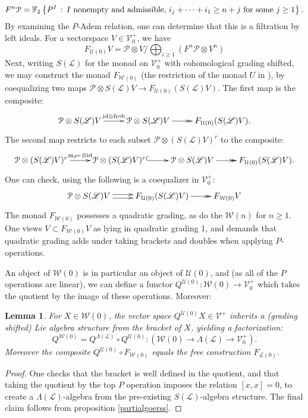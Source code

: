 \documentclass[11pt]{amsart}
\theoremstyle{plain}
\newtheorem{lem}[thm]{Lemma}
\theoremstyle{definition}
\renewcommand{\to}{\longrightarrow}
\newcommand{\scrL}{\mathscr{L}}
\newcommand{\calW}{\mathcal{W}}
\newcommand{\calU}{\mathcal{U}}
\newcommand{\calP}{\mathcal{P}}
\newcommand{\calL}{\mathcal{L}}
\newcommand{\calV}{\mathcal{V}}
\theoremstyle{plain}
\newcommand{\Palg}{{\calP}}
\newcommand{\LieOperad}{{\scrL}}
\newcommand{\vect}[2]{\calV^{#1}_{#2}}
\newcommand{\F}{\mathbb{F}}
\newcommand{\Id}{\textup{id}}
\begin{document}
\begin{Constructing homotopy and cohomotopy operations}
\begin{shaded}
\[F^n\Palg=\F_2\left\{P^I\,:\,\textup{$I$ nonempty and admissible, }i_j+\cdots +i_1\geq n+j\textup{ for some $j\geq 1$}\right\}.\]
By examining the $P$-Adem relation, one can determine that this is a filtration by left ideals. For a vectorspace $V\in\vect{+}{0}$, we have
\[F_{\calU(0)}V=\Palg\otimes V/\bigoplus_{i\geq1}(F^n\Palg\otimes V^n)\]
Next, writing $S(\LieOperad)$ for the monad on $\vect{+}{0}$ with cohomological grading shifted, we may construct the monad $F_{\calW(0)}$ (the restriction of the monad $U$ in \cite[p.\ 18]{MR1089001}), by coequalizing two maps $\Palg\otimes S(\LieOperad)V\to F_{\calU(0)} (S(\LieOperad)V)$. The first map is the composite:
\[\xymatrix@R=4mm{
\Palg\otimes S(\LieOperad)V\ar[r]^-{\Id\otimes \textup{frob}}
&%
\Palg\otimes S(\LieOperad)V\ar@{->>}[r]&%
F_{\calU(0)}(S(\LieOperad)V).%
}\]
The second map restricts to each subset $\Palg\otimes (S(\LieOperad)V)^r$ to the composite:
\[\xymatrix@R=4mm{
\Palg\otimes (S(\LieOperad)V)^r\ar[r]^-{\textup{m}_{P^r}\otimes\Id}
&
\Palg\otimes (S(\LieOperad)V)^r\ar@{^{(}->}[r]
&%
\Palg\otimes S(\LieOperad)V\ar@{->>}[r]&%
F_{\calU(0)}(S(\LieOperad)V).%
}\]
One can check, using \cite[p.\ 18]{MR1089001} the following is a coequalizer in $\vect{+}{0}$:
\[\xymatrix@R=4mm{
\Palg\otimes S(\LieOperad)V\ar@<.5ex>[r]\ar@<-.5ex>[r]
&%
F_{\calU(0)}(S(\LieOperad)V)\ar@{->>}[r]
&%
F_{\calW(0)}V%
}\]
The monad $F_{\calW(0)}$ possesses a quadratic grading, as do the $\calW(n)$ for $n\geq1$. One views $V\subset F_{\calW(0)}V$ as lying in quadratic grading 1, and demands that quadratic grading adds under taking brackets and doubles when applying $P$-operations.
\end{shaded}
An object of $\calW(0)$ is in particular an object of $\calU(0)$, and (as all of the $P$ operations are linear), we can define a functor $Q^{\calU(0)}:\calW(0)\to\vect{+}{0}$ which takes the quotient by the image of these operations. Moreover:
\begin{lem}\label{Kill P ops gives lie alg}
For $X\in\calW(0)$, the vector space $Q^{\calU(0)}X\in\vect{+}{}$ inherits a (grading shifted) Lie algebra structure from the bracket of $X$, yielding a factorization:%
\[Q^{\calW(0)}=Q^{\Lambda(\LieOperad)}\circ Q^{\calU(0)}:\left(\calW(0)\to \Lambda(\LieOperad)\to \vect{+}{0}\right).\]
Moreover the composite $Q^{\calU(0)}\circ F_{\calW(0)}$ equals the free construction $F_{\calL(0)}$.
\end{lem}
\begin{proof}
One checks that the bracket is well defined in the quotient, and that taking the quotient by the top $P$ operation imposes the relation $[x,x]=0$, to create a $\Lambda(\LieOperad)$-algebra from the pre-existing $S(\LieOperad)$-algebra structure. The final claim follows from proposition \ref{partialgoerss}.
\end{proof}


\end{Constructing homotopy and cohomotopy operations}
\end{document}
